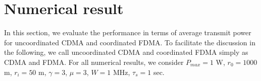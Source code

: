 \section{Numerical result}
\label{sec:numerical-res}
In this section, we evaluate the performance in terms of average transmit power for uncoordinated CDMA and coordinated FDMA. To facilitate the discussion in the following, we call uncoordinated CDMA and coordinated FDMA simply as CDMA and FDMA. For all numerical results, we consider $P_{max} = 1$ W, $r_0 = 1000$ m,  $r_i = 50$ m, $\gamma=3$, $\mu=3$, $W = 1$ MHz, $\tau_s = 1$ sec. 
